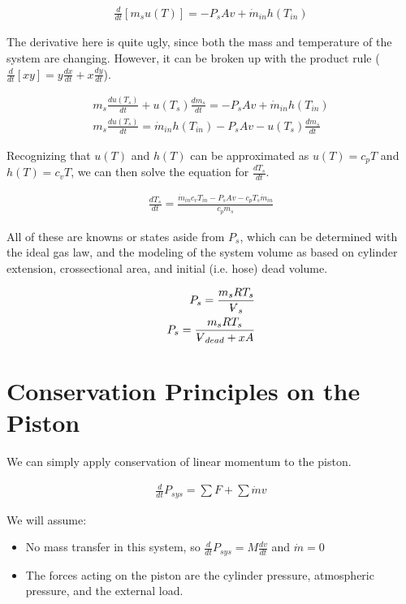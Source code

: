 \documentclass[10pt,letterpaper]{article}
\newcommand{\volume}{{\ooalign{\hfil$V$\hfil\cr\kern0.08em--\hfil\cr}}}
\begin{document}
	\begin{align}
		\frac{d}{dt} [m_s u(T)] = - P_s A v + \dot{m}_{in} h(T_{in}) \nonumber
	\end{align}
	
	The derivative here is quite ugly, since both the mass and temperature of the system are changing. However, it can be broken up with the product rule ($\frac{d}{dt}[xy] = y \frac{dx}{dt} + x \frac{dy}{dt}$).
	
	\begin{align} 
		m_s \frac{d u(T_s)}{dt} + u(T_s) \frac{d m_s}{dt} = - P_s A v + \dot{m}_{in} h(T_{in}) \nonumber \\
		m_s \frac{d u(T_s)}{dt} = \dot{m}_{in} h(T_{in}) - P_s A v - u(T_s) \frac{d m_s}{dt} \nonumber
	\end{align}
	
	Recognizing that $u(T)$ and $h(T)$ can be approximated as $u(T) = c_p T$ and $h(T) = c_v T$, we can then solve the equation for $\frac{dT_s}{dt}$.
	
	\begin{align} 
		\frac{d T_s}{dt} = \frac{ \dot{m}_{in} c_v T_{in} - P_s A v - c_p T_s \dot{m}_{in} }{c_p m_s}
	\end{align}
	
	All of these are knowns or states aside from $P_s$, which can be determined with the ideal gas law, and the modeling of the system volume as based on cylinder extension, crossectional area, and initial (i.e. hose) dead volume.
	
	\begin{align}
		P_s = \frac{m_s R T_s}{\volume_s} \nonumber \\
		P_s = \frac{m_s R T_s}{\volume_{dead} + x A}
	\end{align}
	
	\section*{Conservation Principles on the Piston}
	
	We can simply apply conservation of linear momentum to the piston.
	
	\begin{align}
		\frac{d}{dt} P_{sys}= \sum F + \sum \dot{m} v \nonumber
	\end{align}
	
	We will assume:
	\begin{itemize}
		\item No mass transfer in this system, so $\frac{d}{dt} P_{sys} = M \frac{dv}{dt}$ and $\dot{m}=0$
		\item The forces acting on the piston are the cylinder pressure, atmospheric pressure, and the external load.
	\end{itemize}
	
\end{document}
